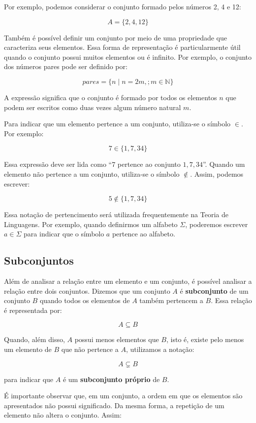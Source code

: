 \documentclass[
  brazilian,
  letterpaper,
]{book}
\theoremstyle{plain}
\theoremstyle{definition}
\theoremstyle{remark}
\begin{document}
Por exemplo, podemos considerar o conjunto formado pelos números 2, 4 e
12:

\[
A = \{2,4,12\}
\]

Também é possível definir um conjunto por meio de uma propriedade que
caracteriza seus elementos. Essa forma de representação é
particularmente útil quando o conjunto possui muitos elementos ou é
infinito. Por exemplo, o conjunto dos números pares pode ser definido
por:

\[
pares = \{n \mid n = 2m,; m \in \mathbb{N}\}
\]

A expressão significa que o conjunto é formado por todos os elementos
\(n\) que podem ser escritos como duas vezes algum número natural \(m\).

Para indicar que um elemento pertence a um conjunto, utiliza-se o
símbolo \(\in\). Por exemplo:

\[
7 \in \{1,7,34\}
\]

Essa expressão deve ser lida como ``7 pertence ao conjunto
\({1,7,34}\)''. Quando um elemento não pertence a um conjunto,
utiliza-se o símbolo \(\notin\). Assim, podemos escrever:

\[
5 \notin \{1,7,34\}
\]

Essa notação de pertencimento será utilizada frequentemente na Teoria de
Linguagens. Por exemplo, quando definirmos um alfabeto \(\Sigma\),
poderemos escrever \(a \in \Sigma\) para indicar que o símbolo \(a\)
pertence ao alfabeto.

\subsection{Subconjuntos}\label{subconjuntos}

Além de analisar a relação entre um elemento e um conjunto, é possível
analisar a relação entre dois conjuntos. Dizemos que um conjunto \(A\) é
\textbf{subconjunto} de um conjunto \(B\) quando todos os elementos de
\(A\) também pertencem a \(B\). Essa relação é representada por:

\[
A \subseteq B
\]

Quando, além disso, \(A\) possui menos elementos que \(B\), isto é,
existe pelo menos um elemento de \(B\) que não pertence a \(A\),
utilizamos a notação:

\[
A \subsetneq B
\]

para indicar que \(A\) é um \textbf{subconjunto próprio} de \(B\).

É importante observar que, em um conjunto, a ordem em que os elementos
são apresentados não possui significado. Da mesma forma, a repetição de
um elemento não altera o conjunto. Assim:
\end{document}
